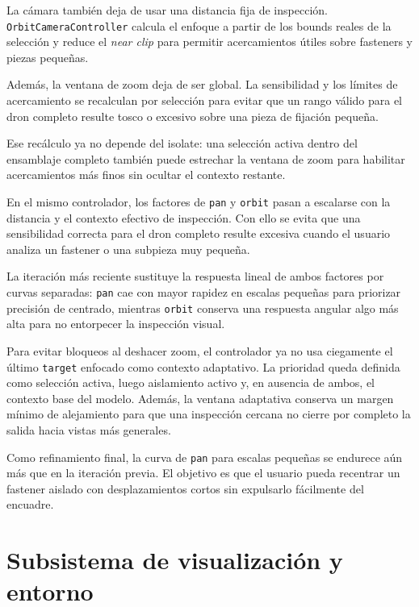 \documentclass[12pt,letterpaper]{article}
\begin{document}
\noindent La cámara también deja de usar una distancia fija de inspección. \texttt{OrbitCameraController} calcula el enfoque a partir de los bounds reales de la selección y reduce el \textit{near clip} para permitir acercamientos útiles sobre fasteners y piezas pequeñas.

\noindent Además, la ventana de zoom deja de ser global. La sensibilidad y los límites de acercamiento se recalculan por selección para evitar que un rango válido para el dron completo resulte tosco o excesivo sobre una pieza de fijación pequeña.

\noindent Ese recálculo ya no depende del isolate: una selección activa dentro del ensamblaje completo también puede estrechar la ventana de zoom para habilitar acercamientos más finos sin ocultar el contexto restante.

\noindent En el mismo controlador, los factores de \texttt{pan} y \texttt{orbit} pasan a escalarse con la distancia y el contexto efectivo de inspección. Con ello se evita que una sensibilidad correcta para el dron completo resulte excesiva cuando el usuario analiza un fastener o una subpieza muy pequeña.

\noindent La iteración más reciente sustituye la respuesta lineal de ambos factores por curvas separadas: \texttt{pan} cae con mayor rapidez en escalas pequeñas para priorizar precisión de centrado, mientras \texttt{orbit} conserva una respuesta angular algo más alta para no entorpecer la inspección visual.

\noindent Para evitar bloqueos al deshacer zoom, el controlador ya no usa ciegamente el último \texttt{target} enfocado como contexto adaptativo. La prioridad queda definida como selección activa, luego aislamiento activo y, en ausencia de ambos, el contexto base del modelo. Además, la ventana adaptativa conserva un margen mínimo de alejamiento para que una inspección cercana no cierre por completo la salida hacia vistas más generales.

\noindent Como refinamiento final, la curva de \texttt{pan} para escalas pequeñas se endurece aún más que en la iteración previa. El objetivo es que el usuario pueda recentrar un fastener aislado con desplazamientos cortos sin expulsarlo fácilmente del encuadre.

\section{Subsistema de visualización y entorno}
\end{document}
